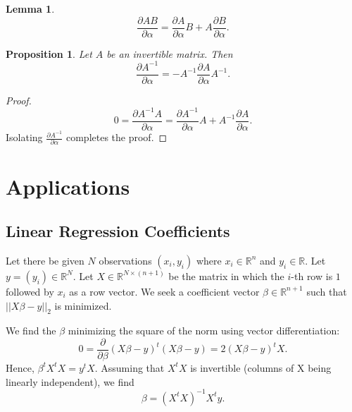 \documentclass{article}
\theoremstyle{plain}
\newtheorem{lemma}[theorem]{Lemma}
\newtheorem{proposition}[theorem]{Proposition}
\newcommand{\diff}[2]{\frac{\partial {#1}}{\partial {#2}}}
\newcommand{\R}{\mathbb{R}}
\begin{document}
\begin{lemma}
\begin{equation}
\diff{AB}{\alpha} = \diff{A}{\alpha} B + A \diff{B}{\alpha}.
\end{equation}
\end{lemma}

\begin{proposition}
Let $A$ be an invertible matrix. Then
\begin{equation}
\diff{A^{-1}}{\alpha} = - A^{-1} \diff{A}{\alpha} A^{-1}.
\end{equation}
\end{proposition}
\begin{proof}
\begin{equation*}
0 = \diff{A^{-1} A}{\alpha} = \diff{A^{-1}}{\alpha} A + A^{-1} \diff{A}{\alpha}.
\end{equation*}
Isolating $\diff{A^{-1}}{\alpha}$ completes the proof.
\end{proof}


\section{Applications}
\subsection{Linear Regression Coefficients}
Let there be given $N$ observations $(x_i, y_i)$ where $x_i \in \R^n$ and $y_i \in \R$. Let $y = (y_i) \in \R^N$. Let $X \in \R^{N \times (n+1)}$ be the matrix in which the $i$-th row is $1$ followed by $x_i$ as a row vector. We seek a coefficient vector $\beta \in \R^{n+1}$ such that $\lvert\lvert X \beta - y \rvert\rvert_2$ is minimized.

We find the $\beta$ minimizing the square of the norm using vector differentiation:
\begin{equation}
0 = \diff{}{\beta} (X \beta - y)^t (X \beta - y) = 2 (X \beta - y)^t X.
\end{equation}
Hence, $\beta^t X^t X = y^t X$. Assuming that $X^t X$ is invertible (columns of X being linearly independent), we find
\begin{equation}
\beta = (X^t X)^{-1} X^t y.
\end{equation}
\end{document}
